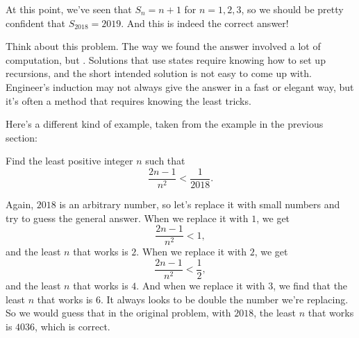 \documentclass[11pt,paper=letter]{scrartcl}
\begin{document}
At this point, we've seen that $S_n = n+1$ for $n = 1, 2, 3$, so we should be pretty confident that $S_{2018} = 2019$. And this is indeed the correct answer!

Think about this problem. The way we found the answer involved a lot of computation, but . Solutions that use states require knowing how to set up recursions, and the short intended solution is not easy to come up with. Engineer's induction may not always give the answer in a fast or elegant way, but it's often a method that requires knowing the least tricks.

Here's a different kind of example, taken from the example in the previous section:

\begin{exboxed}
  Find the least positive integer $n$ such that
  \[
    \frac{2n-1}{n^2} < \frac{1}{2018}.
  \]
\end{exboxed}

Again, $2018$ is an arbitrary number, so let's replace it with small numbers and try to guess the general answer. When we replace it with $1$, we get
\[
  \frac{2n-1}{n^2} < 1,
\]
and the least $n$ that works is $2$. When we replace it with $2$, we get
\[
  \frac{2n-1}{n^2} < \frac{1}{2},
\]
and the least $n$ that works is $4$. And when we replace it with $3$, we find that the least $n$ that works is $6$. It always looks to be double the number we're replacing. So we would guess that in the original problem, with $2018$, the least $n$ that works is $4036$, which is correct.
\end{document}
